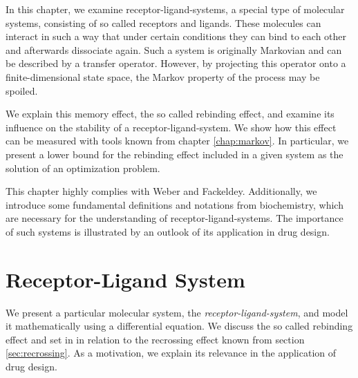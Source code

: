 In this chapter, we examine receptor-ligand-systems, a special type of molecular systems, consisting of so called receptors and ligands. %
These molecules can interact in such a way that under certain conditions they can bind to each other and afterwards dissociate again.
Such a system is originally Markovian and can be described by a transfer operator.
However, by projecting this operator onto a finite-dimensional state space, the Markov property of the process may be spoiled.

We explain this memory effect, the so called rebinding effect, and examine its influence on the stability of a receptor-ligand-system. We show how this effect can be measured with tools known from chapter \ref{chap:markov}. %
In particular, we present a lower bound for the rebinding effect included in a given system as the solution of an optimization problem.

This chapter highly complies with Weber and Fackeldey\cite{weber2014}.
Additionally, we introduce some fundamental definitions and notations from biochemistry, which are necessary for the understanding of receptor-ligand-systems.
The importance of such systems is illustrated by an outlook of its application in drug design. %

\section{Receptor-Ligand System}
\label{sec:rebinding}

We present a particular molecular system, the \textit{receptor-ligand-system}, and model it mathematically using a differential equation.
We discuss the so called rebinding effect and set in in relation to the recrossing effect known from section \ref{sec:recrossing}.
As a motivation, we explain its relevance in the application of drug design.

